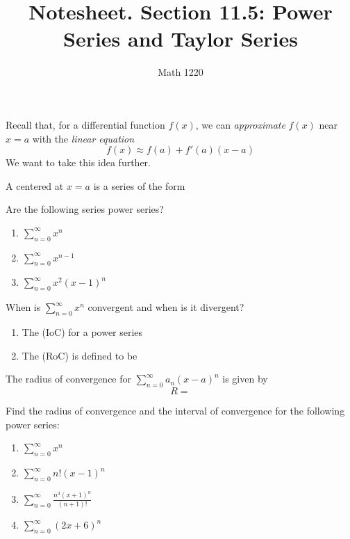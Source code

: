 \documentclass[12pt, a4paper]{article}
\author{Math 1220}
\title{Notesheet. Section 11.5: Power Series and Taylor Series}
\date{}
\begin{document}
\maketitle
\nameline
\begin{rmk}
  Recall that, for a differential function \(f(x)\), we can
  \emph{approximate} \(f(x)\) near \(x=a\) with the \emph{linear equation} \[
    f(x) \approx f(a) + f'(a)(x-a)
  \]
  We want to take this idea further.
\end{rmk}
\begin{defn}
  A  centered at \(x=a\) is a series of the form
\end{defn}
\vspace{0.5in}
\begin{ex}
  Are the following series power series?
  \begin{enumerate}
  \item \(\sum_{n=0}^\infty x^n\)
  \item \(\sum_{n=0}^\infty x^{n-1}\)
  \item \(\sum_{n=0}^\infty x^2(x-1)^n\)
  \end{enumerate}
\end{ex}
\vspace{-2in}
\begin{ex}
  When is \(\sum_{n=0}^\infty x^n\) convergent and when is it divergent?
\end{ex}
\pagebreak
\begin{defn}
  \begin{enumerate}
  \item The  (IoC) for a power series
    \vspace{0.75in}
  \item The  (RoC) is defined to be
    \vspace{0.5in}
  \end{enumerate}
\end{defn}
\begin{thrm}
  The radius of convergence for \(\sum_{n=0}^\infty a_n(x-a)^n\) is
  given by \[
    R = 
  \]
\end{thrm}
\begin{ex}
  Find the radius of convergence and the interval of convergence for
  the following power series:
  \begin{enumerate}
  \item \(\sum_{n=0}^\infty x^n\)
    \vspace{0.5in}
  \item \(\sum_{n=0}^\infty n! (x-1)^n\)
    \vspace{0.5in}
  \item \(\sum_{n=0}^\infty \frac{n^3(x+1)^n}{(n+1)!}\)
    \vspace{0.5in}
  \item \(\sum_{n=0}^\infty (2x+6)^n\)
  \end{enumerate}
\end{ex}
\vspace{-1.5in}
\end{document}
